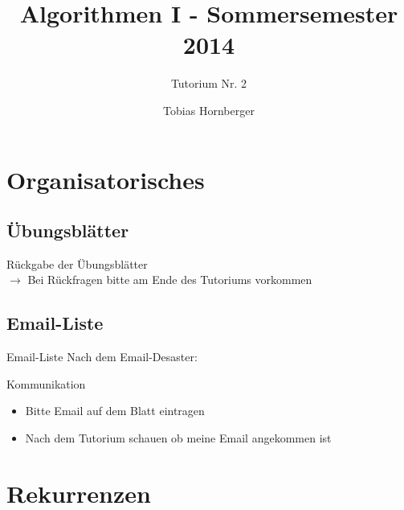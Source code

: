 \documentclass[18pt]{beamer}
\title[Algo Tutorium Nr.2]{Algorithmen I - Sommersemester 2014}
\subtitle{Tutorium Nr. 2}
\author{Tobias Hornberger}
\institute{Institut für Theoretische Informatik}
\begin{document}

\begin{frame}
\titlepage
\end{frame}



\section{Organisatorisches}
\subsection{Übungsblätter}
\begin{frame}
	\begin{center}
 			\huge{Rückgabe der Übungsblätter} \\
 			\parskip 36pt
 			\normalsize{$\rightarrow$ Bei Rückfragen bitte am Ende des Tutoriums vorkommen}
 		\end{center}
 	\end{frame}
 
 \subsection{Email-Liste}
 
 	\begin{frame}{Email-Liste}
 		Nach dem Email-Desaster: \\
 		\parskip 20pt
 		\begin{block}{Kommunikation}
 			\begin{itemize}
 				\item Bitte Email auf dem Blatt eintragen
 				\item Nach dem Tutorium schauen ob meine Email angekommen ist
 			\end{itemize}
 		\end{block}
 	\end{frame}

\section{Rekurrenzen}
\end{document}
